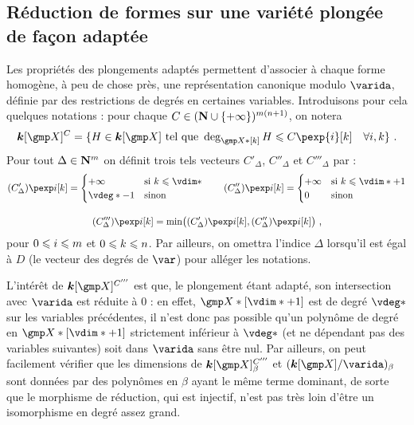 
\subsection{Réduction de formes sur une variété plongée de façon adaptée}
\label{sec:rfull}

Les propriétés des plongements adaptés permettent d'associer à chaque forme
homogène, à peu de chose près, une représentation canonique modulo \( \varida
\), définie par des restrictions de degrés en certaines variables.
Introduisons pour cela quelques notations : pour chaque \( C \in ({\mathbf{N}} \cup
  \lbrace +\infty \rbrace) ^{m(n+1)} \), on notera
\begin{equation} \label{e:C-spaces}
  \cdn[\vmp]^C
  = \{
    H \in \cdn[\vmp]
    \text{ tel que }
    \deg_{\vmp*[k]} H \le C\pexp{\fct}[k]
    \quad \forall i, k
    \}
  \pmm.
\end{equation}
Pour tout \( \Delta \in {\mathbf{N}}^m \) on définit trois tels vecteurs \(
  C'_\Delta \), \( C''_\Delta \) et \( C'''_\Delta \) par :
\begin{gather} \label{e:C-i-iii}
  (C'_\Delta)\pexp\fct[\ind] =
  \begin{cases}
    +\infty & \text{si \( \ind \le \vdim* \)} \\
    \vdeg* - 1 & \text{sinon}
  \end{cases}
  \qquad
  (C''_\Delta)\pexp\fct[\ind] =
  \begin{cases}
    +\infty & \text{si \( \ind \le \vdim* + 1 \)} \\
    0 & \text{sinon}
  \end{cases}
  \\[1em]
  (C'''_\Delta)\pexp\fct[\ind] = \min\bigl(
    (C'_\Delta)\pexp\fct[\ind], (C''_\Delta)\pexp\fct[\ind]
  \bigr)
  \pmm,
\end{gather}
pour \( 0 \leqslant i \leqslant m \) et \( 0 \leqslant k \leqslant n \).  Par ailleurs, on
omettra l'indice \( \Delta \) lorsqu'il est égal à \( D \) (le vecteur des
degrés de \( \var \)) pour alléger les notations.

L'intérêt de \( \cdn[ \vmp ]^{C'''} \) est que, le plongement étant
adapté, son intersection avec \( \varida \) est réduite à \( 0 \) : en effet,
\( \vmp*[\vdim*+1] \) est de degré \( \vdeg* \) sur les variables précédentes,
il n'est donc pas possible qu'un polynôme de degré en \( \vmp*[\vdim*+1] \)
strictement inférieur à \( \vdeg* \) (et ne dépendant pas des variables
suivantes) soit dans \( \varida \) sans être nul.
Par ailleurs, on peut facilement vérifier que les dimensions de \( \cdn[ \vmp
  ]^{C'''}_{\beta} \) et \( ( \cdn[\vmp] / \varida )_\beta \) sont données par
des polynômes en \( \beta \) ayant le même terme dominant, de sorte que le
morphisme de réduction, qui est injectif, n'est pas très loin d'être un
isomorphisme en degré assez grand.

